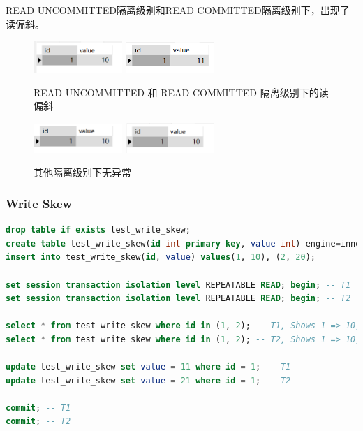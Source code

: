 \documentclass{article}
\begin{document}
READ UNCOMMITTED隔离级别和READ COMMITTED隔离级别下，出现了读偏斜。

\begin{figure}[H]
\centering
\includegraphics[width=0.3\textwidth]{img/60.png}
\includegraphics[width=0.3\textwidth]{img/61.png}
\caption{READ UNCOMMITTED 和 READ COMMITTED 隔离级别下的读偏斜}
\end{figure}

\begin{figure}[H]
\centering
\includegraphics[width=0.3\textwidth]{img/62.png}
\includegraphics[width=0.3\textwidth]{img/63.png}
\caption{其他隔离级别下无异常}
\end{figure}

\subsubsection{Write Skew}

\begin{lstlisting}[language=sql]
drop table if exists test_write_skew;
create table test_write_skew(id int primary key, value int) engine=innodb;
insert into test_write_skew(id, value) values(1, 10), (2, 20);

set session transaction isolation level REPEATABLE READ; begin; -- T1
set session transaction isolation level REPEATABLE READ; begin; -- T2

select * from test_write_skew where id in (1, 2); -- T1, Shows 1 => 10, 2 => 20
select * from test_write_skew where id in (1, 2); -- T2, Shows 1 => 10, 2 => 20

update test_write_skew set value = 11 where id = 1; -- T1
update test_write_skew set value = 21 where id = 1; -- T2

commit; -- T1
commit; -- T2
\end{lstlisting}
\end{document}

